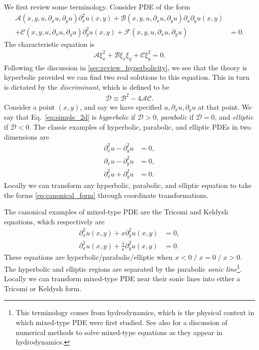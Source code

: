 \documentclass{ws-ijmpd}
\begin{document}
We first review some terminology\cite{evans2010partial}.
Consider PDE of the form
\begin{align}
\label{eq:simple_2d}
   \mathcal{A}\left(x,y,u,\partial_xu,\partial_yu\right)\partial_x^2u(x,y)
   +
   \mathcal{B}\left(x,y,u,\partial_xu,\partial_yu\right)\partial_x\partial_yu(x,y)
   &
   \nonumber\\
   +
   \mathcal{C}\left(x,y,u,\partial_xu,\partial_yu\right)\partial_y^2u(x,y)
   +
   \mathcal{F}\left(x,y,u,\partial_xu,\partial_yu\right)
   &=
   0
   .
\end{align}
The characteristic equation is
\begin{align}
   \mathcal{A}\xi_x^2
   +
   \mathcal{B}\xi_x\xi_y
   +
   \mathcal{C}\xi_y^2
   =
   0
   .
\end{align}
Following the discussion in \ref{sec:review_hyperbolicity}, we see that
the theory is hyperbolic provided we can find two real solutions to this
equation.
This in turn is dictated by the \emph{discriminant}, which is defined to be
\begin{align}
   \mathcal{D}
   \equiv
   \mathcal{B}^2
   -
   4\mathcal{A}\mathcal{C}
   .
\end{align}
Consider a point $(x,y)$, and say we have specified
$u,\partial_xu,\partial_yu$ at that point.
We say that Eq.~\eqref{eq:simple_2d} is
\emph{hyperbolic} if $\mathcal{D}>0$, \emph{parabolic} if $\mathcal{D}=0$,
and \emph{elliptic} if $\mathcal{D}<0$.
The classic examples of hyperbolic, parabolic, and elliptic PDEs in two
dimensions are
\begin{subequations}
\label{eq:canonical_form}
\begin{align}
   \partial_x^2u - \partial_y^2u
   &=
   0
   ,\\
   \partial_xu - \partial_y^2u
   &=
   0
   ,\\
   \partial_x^2u + \partial_y^2u
   &=
   0
   .
\end{align}
\end{subequations}
Locally we can transform any hyperbolic, parabolic, and elliptic
equation to take the forms \eqref{eq:canonical_form}
through coordinate transformations.

The canonical examples of mixed-type PDE are the Tricomi
and Keldysh equations\cite{chen2015tricomi}, which respectively are 
\begin{align}
   \partial_x^2u(x,y)
   +
   x
   \partial_y^2u(x,y)
   &=
   0
   ,\\
   \partial_x^2u(x,y)
   +
   \frac{1}{x}
   \partial_y^2u(x,y)
   &=
   0
   .
\end{align}
These equations are hyperbolic/parabolic/elliptic when 
$x<0 \; / \; x=0 \; / \; x > 0$.
The hyperbolic and elliptic regions are separated by the parabolic
\emph{sonic line}\footnote{This terminology comes from hydrodynamics,
which is the physical context in which mixed-type PDE were
first studied\cite{bams/1183548680,doi:10.1142/S0219891604000081}.
See also  for a discussion of numerical
methods to solve mixed-type equations as they appear in
hydrodynamics.}.
Locally we can transform mixed-type PDE near their sonic lines
into either a Tricomi or Keldysh form.
\end{document}

